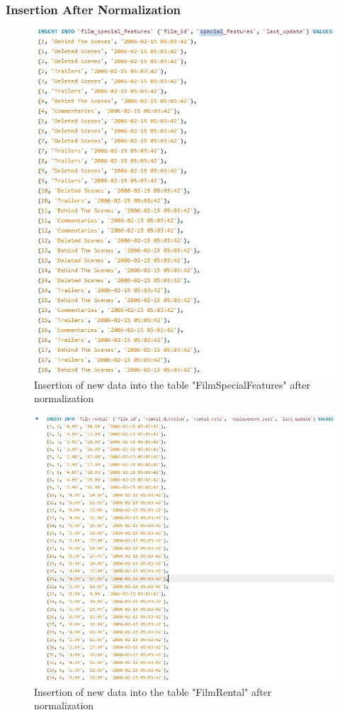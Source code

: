 \documentclass[openany]{article}
\begin{document}
	\subsubsection{Insertion After Normalization}
		\begin{figure}[H]
			\includegraphics[width=\textwidth, height=\textheight, keepaspectratio]{specialfeatures11_insert}
			\caption{Insertion of new data into the table "Film\textunderscore Special\textunderscore Features" after normalization}
		\end{figure}
		\begin{figure}[H]
			\includegraphics[width=\textwidth, height=\textheight, keepaspectratio]{filmrental_insert_norm}
			\caption{Insertion of new data into the table "Film\textunderscore Rental" after normalization}
		\end{figure}
\end{document}
